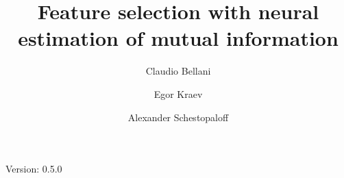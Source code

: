 \documentclass{mypaper}
\author[1]{
Claudio Bellani
}
\author[2]{
Egor Kraev
}
\author[1]{
Alexander Schestopaloff
}
\affil[1]{
	Queen Mary University of London
}
\affil[2]{
	Wise Payments Ltd.
}
\title{Feature selection with neural estimation of mutual information}
\begin{document}
\maketitle

Version: 0.5.0







\end{document}
